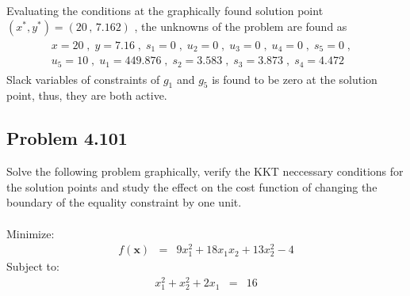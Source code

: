 \documentclass[]{report}
\begin{document}
Evaluating the conditions at the graphically found solution point $\left(x^*,y^*\right)=\left(20\, ,\,  7.162\right)$ , the unknowns of the problem are found as
\begin{eqnarray*}
\begin{array}{lc}
 x=20\;,\;y=7.16\;,\;s_1=0\;,\;u_2=0\;,\;u_3=0\;,\; u_4=0\;,\; s_5=0\;,&\\ u_5=10\;,\;u_1=449.876\;,\;s_2=3.583\;,\; s_3=3.873\;,\; s_4=4.472\;&
 \end{array}
\end{eqnarray*}
Slack variables of constraints of $g_1$ and $g_5$ is found to be zero at the solution point, thus, they are both active.
\subsection*{Problem 4.101}
Solve the following problem graphically, verify the KKT neccessary conditions for the solution points and study the effect on the cost function of changing the boundary of the equality constraint by one unit.\\ 
~
\\
Minimize:
\begin{eqnarray*}
f\left(\mathbf x\right) &=& 9 x_1^2+18x_1 x_2+13x_2^2-4
\end{eqnarray*} 
Subject to:
\begin{eqnarray*}
x_1^2+x_2^2+2x_1&=& 16
\end{eqnarray*} 
\end{document}
